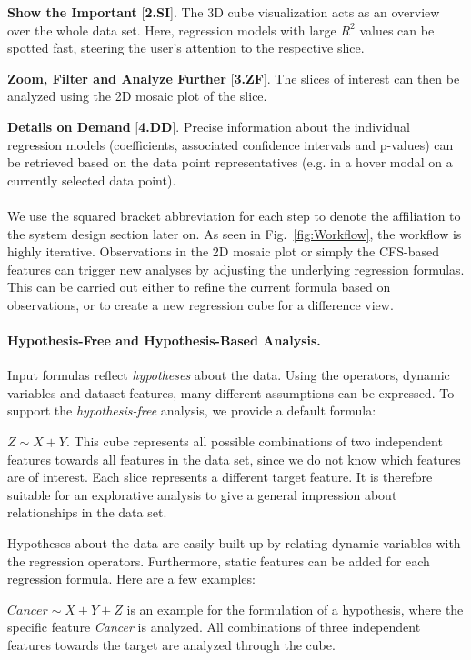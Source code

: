\documentclass[journal]{style/vgtc} 			          %
\begin{document}
\textbf{Show the Important} [\textbf{2.SI}]. The 3D cube visualization acts as an overview over the whole data set.
Here, regression models with large $R^2$ values can be spotted fast, steering the user's attention to the respective slice.

\textbf{Zoom, Filter and Analyze Further} [\textbf{3.ZF}]. The slices of interest can then be analyzed using the 2D mosaic plot of the slice.

\textbf{Details on Demand} [\textbf{4.DD}]. Precise information about the individual regression models (coefficients, associated confidence intervals and p-values) can be retrieved based on the data point representatives (e.g. in a hover modal on a currently selected data point).
\\\\
We use the squared bracket abbreviation for each step to denote the affiliation to the system design section later on.
As seen in Fig.~\ref{fig:Workflow}, the workflow is highly iterative.
Observations in the 2D mosaic plot or simply the CFS-based features can trigger new analyses by adjusting the underlying regression formulas.
This can be carried out either to refine the current formula based on observations, or to create a new regression cube for a difference view.
\paragraph{Hypothesis-Free and Hypothesis-Based Analysis.}
Input formulas reflect \emph{hypotheses} about the data.
Using the operators, dynamic variables and dataset features, many different assumptions can be expressed.
To support the \emph{hypothesis-free} analysis, we provide a default formula:

$Z \sim X + Y$.
This cube represents all possible combinations of two independent features towards all features in the data set, since we do not know which features are of interest.
Each slice represents a different target feature.
It is therefore suitable for an explorative analysis to give a general impression about relationships in the data set.

Hypotheses about the data are easily built up by relating dynamic variables with the regression operators.
Furthermore, static features can be added for each regression formula.
Here are a few examples:

$Cancer \sim X + Y + Z$ is an example for the formulation of a hypothesis, where the specific feature \textit{Cancer} is analyzed.
All combinations of three independent features towards the target are analyzed through the cube.
\end{document}
